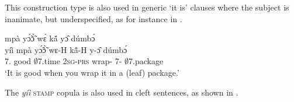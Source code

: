 \noindent This construction type is also used in generic `it is' clauses where the subject is inanimate, but underspecified, as for instance in .

\ea \label{ID7}
   mpà yɔ̃́ɔ̃̀ wɛ́ kã́ yɔ̂ dúmbɔ́ \\
       yíì mpà yɔ̃́ɔ̃̀ wɛ-H kã̂-H y-ɔ̂ dúmbɔ́ \\
         7.{\COP} good $\emptyset$7.time 2\textsc{sg}-\textsc{prs} wrap-{\R} 7-{\OBJ} $\emptyset$7.package\\
    \trans `It is good when you wrap it in a (leaf) package.'
\z

\noindent The {\itshape yíì} \textsc{stamp} copula is also used in cleft sentences, as shown in .










